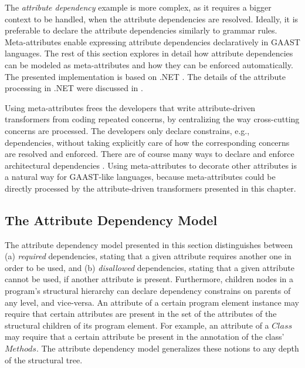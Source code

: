 The \textit{attribute dependency} example  is more complex, as it requires a bigger context to be handled, when the attribute dependencies are resolved. Ideally, it is preferable to declare the attribute dependencies similarly to grammar rules. Meta-attributes enable expressing attribute dependencies declaratively in GAAST languages. The rest of this section explores in detail how attribute dependencies can be modeled as meta-attributes and how they can be enforced automatically. The presented implementation is based on .NET \cite{www.dotnet}. The details of the attribute processing in .NET were discussed in .

Using meta-attributes frees the developers that write attribute-driven transformers from coding repeated concerns, by centralizing the way cross-cutting concerns are processed. The developers only declare constrains, e.g., dependencies, without taking explicitly care of how the corresponding concerns are resolved and enforced. 
There are of course many ways  to declare and enforce architectural dependencies \cite{minsky.98}. Using meta-attributes to decorate other attributes is a natural way for GAAST-like languages, because meta-attributes could be directly processed by the attribute-driven transformers presented in this chapter. 

\subsection{The Attribute Dependency Model}
\label{sec:model}

The attribute dependency model presented in this section distinguishes between (a) \textit{required} dependencies, stating that a given attribute requires another one in order to be used, and (b) \textit{disallowed} dependencies, stating that a given attribute cannot be used, if another attribute is present. 
Furthermore, children nodes in a program's structural hierarchy can declare dependency constrains on parents of any level, and vice-versa. 
An attribute of a certain program element instance may require that certain attributes are present in the set of the attributes of the structural children of its program element. For example, an attribute of a $Class$ may require that a certain attribute be present in the annotation of the class' $Methods$. The attribute dependency model generalizes these notions to any depth of the structural tree. %

